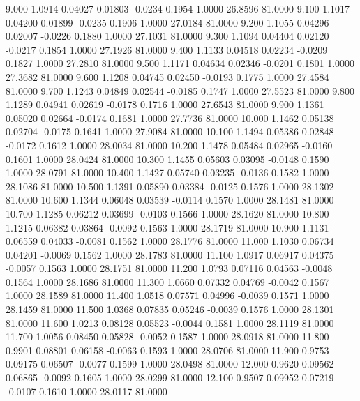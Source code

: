    9.000   1.0914   0.04027   0.01803  -0.0234   0.1954   1.0000  26.8596  81.0000
   9.100   1.1017   0.04200   0.01899  -0.0235   0.1906   1.0000  27.0184  81.0000
   9.200   1.1055   0.04296   0.02007  -0.0226   0.1880   1.0000  27.1031  81.0000
   9.300   1.1094   0.04404   0.02120  -0.0217   0.1854   1.0000  27.1926  81.0000
   9.400   1.1133   0.04518   0.02234  -0.0209   0.1827   1.0000  27.2810  81.0000
   9.500   1.1171   0.04634   0.02346  -0.0201   0.1801   1.0000  27.3682  81.0000
   9.600   1.1208   0.04745   0.02450  -0.0193   0.1775   1.0000  27.4584  81.0000
   9.700   1.1243   0.04849   0.02544  -0.0185   0.1747   1.0000  27.5523  81.0000
   9.800   1.1289   0.04941   0.02619  -0.0178   0.1716   1.0000  27.6543  81.0000
   9.900   1.1361   0.05020   0.02664  -0.0174   0.1681   1.0000  27.7736  81.0000
  10.000   1.1462   0.05138   0.02704  -0.0175   0.1641   1.0000  27.9084  81.0000
  10.100   1.1494   0.05386   0.02848  -0.0172   0.1612   1.0000  28.0034  81.0000
  10.200   1.1478   0.05484   0.02965  -0.0160   0.1601   1.0000  28.0424  81.0000
  10.300   1.1455   0.05603   0.03095  -0.0148   0.1590   1.0000  28.0791  81.0000
  10.400   1.1427   0.05740   0.03235  -0.0136   0.1582   1.0000  28.1086  81.0000
  10.500   1.1391   0.05890   0.03384  -0.0125   0.1576   1.0000  28.1302  81.0000
  10.600   1.1344   0.06048   0.03539  -0.0114   0.1570   1.0000  28.1481  81.0000
  10.700   1.1285   0.06212   0.03699  -0.0103   0.1566   1.0000  28.1620  81.0000
  10.800   1.1215   0.06382   0.03864  -0.0092   0.1563   1.0000  28.1719  81.0000
  10.900   1.1131   0.06559   0.04033  -0.0081   0.1562   1.0000  28.1776  81.0000
  11.000   1.1030   0.06734   0.04201  -0.0069   0.1562   1.0000  28.1783  81.0000
  11.100   1.0917   0.06917   0.04375  -0.0057   0.1563   1.0000  28.1751  81.0000
  11.200   1.0793   0.07116   0.04563  -0.0048   0.1564   1.0000  28.1686  81.0000
  11.300   1.0660   0.07332   0.04769  -0.0042   0.1567   1.0000  28.1589  81.0000
  11.400   1.0518   0.07571   0.04996  -0.0039   0.1571   1.0000  28.1459  81.0000
  11.500   1.0368   0.07835   0.05246  -0.0039   0.1576   1.0000  28.1301  81.0000
  11.600   1.0213   0.08128   0.05523  -0.0044   0.1581   1.0000  28.1119  81.0000
  11.700   1.0056   0.08450   0.05828  -0.0052   0.1587   1.0000  28.0918  81.0000
  11.800   0.9901   0.08801   0.06158  -0.0063   0.1593   1.0000  28.0706  81.0000
  11.900   0.9753   0.09175   0.06507  -0.0077   0.1599   1.0000  28.0498  81.0000
  12.000   0.9620   0.09562   0.06865  -0.0092   0.1605   1.0000  28.0299  81.0000
  12.100   0.9507   0.09952   0.07219  -0.0107   0.1610   1.0000  28.0117  81.0000
